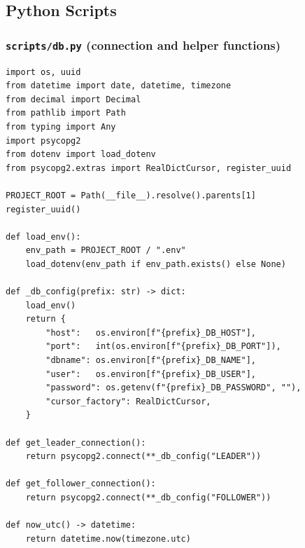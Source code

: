 \documentclass[12pt,a4paper]{article}
\begin{document}
\subsection{Python Scripts}
\label{app:python}

\subsubsection{\texttt{scripts/db.py} (connection and helper functions)}
\begin{lstlisting}[style=pythonstyle]
import os, uuid
from datetime import date, datetime, timezone
from decimal import Decimal
from pathlib import Path
from typing import Any
import psycopg2
from dotenv import load_dotenv
from psycopg2.extras import RealDictCursor, register_uuid

PROJECT_ROOT = Path(__file__).resolve().parents[1]
register_uuid()

def load_env():
    env_path = PROJECT_ROOT / ".env"
    load_dotenv(env_path if env_path.exists() else None)

def _db_config(prefix: str) -> dict:
    load_env()
    return {
        "host":   os.environ[f"{prefix}_DB_HOST"],
        "port":   int(os.environ[f"{prefix}_DB_PORT"]),
        "dbname": os.environ[f"{prefix}_DB_NAME"],
        "user":   os.environ[f"{prefix}_DB_USER"],
        "password": os.getenv(f"{prefix}_DB_PASSWORD", ""),
        "cursor_factory": RealDictCursor,
    }

def get_leader_connection():
    return psycopg2.connect(**_db_config("LEADER"))

def get_follower_connection():
    return psycopg2.connect(**_db_config("FOLLOWER"))

def now_utc() -> datetime:
    return datetime.now(timezone.utc)
\end{lstlisting}
\end{document}
